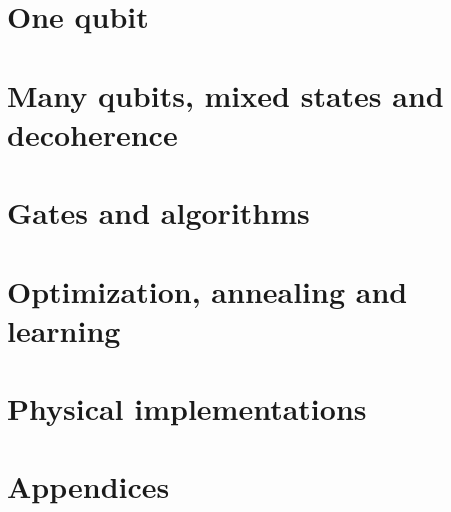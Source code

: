 \documentclass[11pt,a4paper,openany]{book}
\begin{document}
\tableofcontents

\mainmatter
\part{One qubit}







\part{Many qubits, mixed states and decoherence}







\part{Gates and algorithms}








\part{Optimization, annealing and learning}



\part{Physical implementations}


\appendix
\part{Appendices}




\backmatter

\end{document}
